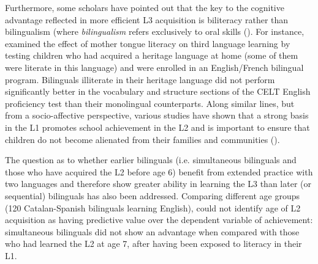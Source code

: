 \documentclass[output=paper,modfonts,nonflat,newtxmath]{langsci/langscibook}
\begin{document}
Furthermore, some scholars have pointed out that the key to the cognitive advantage reflected in more efficient L3 acquisition is biliteracy rather than bilingualism (where \textit{bilingualism} refers exclusively to oral skills (\citealt{SwainEtAl1990, RauchEtAl2012}). For instance, \citet{SwainEtAl1990} examined the effect of mother tongue literacy on third language learning by testing children who had acquired a heritage language at home (some of them were literate in this language) and were enrolled in an English/French bilingual program. Bilinguals illiterate in their heritage language did not perform significantly better in the vocabulary and structure sections of the CELT English proficiency test than their monolingual counterparts. Along similar lines, but from a socio-affective perspective, various studies have shown that a strong basis in the L1 promotes school achievement in the L2 and is important to ensure that children do not become alienated from their families and communities (\citealt{CastroEtAl2011, MurphyEvangelou2016}).

The question as to whether earlier bilinguals (i.e. simultaneous bilinguals and those who have acquired the L2 before age 6) benefit from extended practice with two languages and therefore show greater ability in learning the L3 than later (or sequential) bilinguals has also been addressed. Comparing different age groups (120 Catalan-Spanish bilinguals learning English), \citet{Sanz2008} could not identify age of L2 acquisition as having predictive value over the dependent variable of achievement: simultaneous bilinguals did not show an advantage when compared with those who had learned the L2 at age 7, after having been exposed to literacy in their L1.\largerpage
\end{document}

